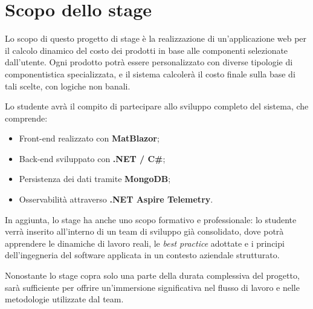 \section*{Scopo dello stage}

Lo scopo di questo progetto di stage è la realizzazione di un'applicazione web per il calcolo dinamico del costo dei prodotti in base alle componenti selezionate dall’utente. Ogni prodotto potrà essere personalizzato con diverse tipologie di componentistica specializzata, e il sistema calcolerà il costo finale sulla base di tali scelte, con logiche non banali.

Lo studente avrà il compito di partecipare allo sviluppo completo del sistema, che comprende:

\begin{itemize}
    \item Front-end realizzato con \textbf{MatBlazor};
    \item Back-end sviluppato con \textbf{.NET / C\#};
    \item Persistenza dei dati tramite \textbf{MongoDB};
    \item Osservabilità attraverso \textbf{.NET Aspire Telemetry}.
\end{itemize}

In aggiunta, lo stage ha anche uno scopo formativo e professionale: lo studente verrà inserito all’interno di un team di sviluppo già consolidato, dove potrà apprendere le dinamiche di lavoro reali, le \textit{best practice} adottate e i principi dell’ingegneria del software applicata in un contesto aziendale strutturato.

Nonostante lo stage copra solo una parte della durata complessiva del progetto, sarà sufficiente per offrire un’immersione significativa nel flusso di lavoro e nelle metodologie utilizzate dal team.
